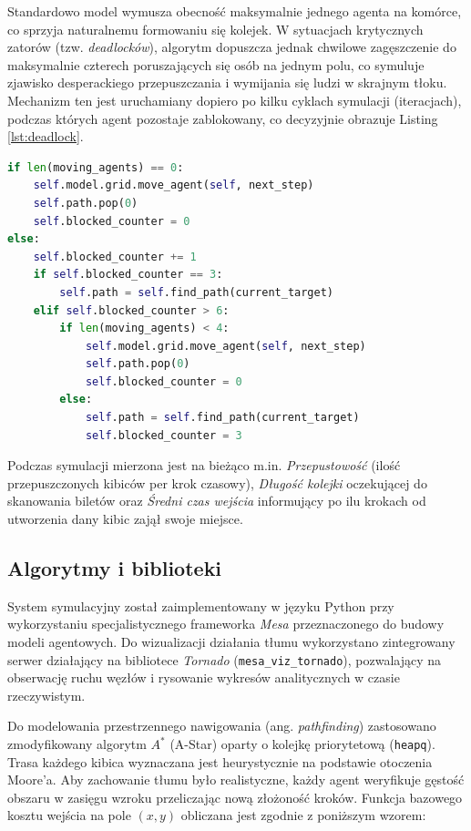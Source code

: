 \documentclass[polish]{projectreport}
\begin{document}
Standardowo model wymusza obecność maksymalnie jednego agenta na komórce, co sprzyja naturalnemu formowaniu się kolejek. W sytuacjach krytycznych zatorów (tzw. \textit{deadlocków}), algorytm dopuszcza jednak chwilowe zagęszczenie do maksymalnie czterech poruszających się osób na jednym polu, co symuluje zjawisko desperackiego przepuszczania i wymijania się ludzi w skrajnym tłoku. Mechanizm ten jest uruchamiany dopiero po kilku cyklach symulacji (iteracjach), podczas których agent pozostaje zablokowany, co decyzyjnie obrazuje Listing \ref{lst:deadlock}.

\begin{lstlisting}[language=Python, caption={Mechanizm omijania i przeciskania się w przypadku przeciążenia korytarza}, label={lst:deadlock}]
if len(moving_agents) == 0:
    self.model.grid.move_agent(self, next_step)
    self.path.pop(0)
    self.blocked_counter = 0
else:
    self.blocked_counter += 1
    if self.blocked_counter == 3:
        self.path = self.find_path(current_target)
    elif self.blocked_counter > 6:
        if len(moving_agents) < 4:
            self.model.grid.move_agent(self, next_step)
            self.path.pop(0)
            self.blocked_counter = 0
        else:
            self.path = self.find_path(current_target)
            self.blocked_counter = 3
\end{lstlisting}

Podczas symulacji mierzona jest na bieżąco m.in. \textit{Przepustowość} (ilość przepuszczonych kibiców per krok czasowy), \textit{Długość kolejki} oczekującej do skanowania biletów oraz \textit{Średni czas wejścia} informujący po ilu krokach od utworzenia dany kibic zajął swoje miejsce.

\subsection{Algorytmy i biblioteki}

System symulacyjny został zaimplementowany w języku Python przy wykorzystaniu specjalistycznego frameworka \textit{Mesa} przeznaczonego do budowy modeli agentowych. Do wizualizacji działania tłumu wykorzystano zintegrowany serwer działający na bibliotece \textit{Tornado} (\texttt{mesa\_viz\_tornado}), pozwalający na obserwację ruchu węzłów i rysowanie wykresów analitycznych w czasie rzeczywistym.

Do modelowania przestrzennego nawigowania (ang. \textit{pathfinding}) zastosowano zmodyfikowany algorytm $A^*$ (A-Star) oparty o kolejkę priorytetową (\texttt{heapq}). Trasa każdego kibica wyznaczana jest heurystycznie na podstawie otoczenia Moore'a. Aby zachowanie tłumu było realistyczne, każdy agent weryfikuje gęstość obszaru w zasięgu wzroku przeliczając nową złożoność kroków. 
Funkcja bazowego kosztu wejścia na pole $(x,y)$ obliczana jest zgodnie z poniższym wzorem:
\end{document}
